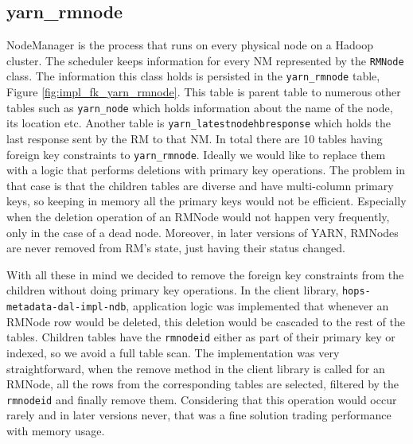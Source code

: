 \subsection{yarn\_rmnode}
\label{ssec:impl_fk_rmnode}
NodeManager is the process that runs on every physical node on a
Hadoop cluster. The scheduler keeps information for every NM
represented by the \texttt{RMNode} class. The information this
class holds is persisted in the \texttt{yarn\_rmnode} table, Figure
\ref{fig:impl_fk_yarn_rmnode}. This table is parent table to
numerous other tables such as \texttt{yarn\_node} which holds
information about the name of the node, its location etc. Another
table is
\texttt{yarn\_latestnodehbresponse} which holds the last response sent
by the RM to that NM. In total there are 10 tables having foreign key
constraints to \texttt{yarn\_rmnode}. Ideally we would like to replace
them with a logic that performs deletions with primary key
operations. The problem in that case is that the children tables are
diverse and have multi-column primary keys, so keeping in memory all
the primary keys would not be efficient. Especially when the deletion
operation of an RMNode would not happen very frequently, only in the case
of a dead node. Moreover, in later versions of YARN, RMNodes are never
removed from RM's state, just having their status changed.

With all these in mind we decided to remove the foreign key
constraints from the children without doing primary key
operations. In the client library, \texttt{hops-metadata-dal-impl-ndb},
application logic was implemented that whenever an RMNode row would be deleted, this
deletion would be cascaded to the rest of the tables. Children tables
have the \texttt{rmnodeid} either as part of their primary key or indexed, so we
avoid a full table scan. The implementation was very straightforward,
when the remove method in the client library is called for an RMNode,
all the rows from the corresponding tables are selected, filtered by the
\texttt{rmnodeid} and finally remove them. Considering that this
operation would occur rarely and in later versions never, that was a
fine solution trading performance with memory usage.

